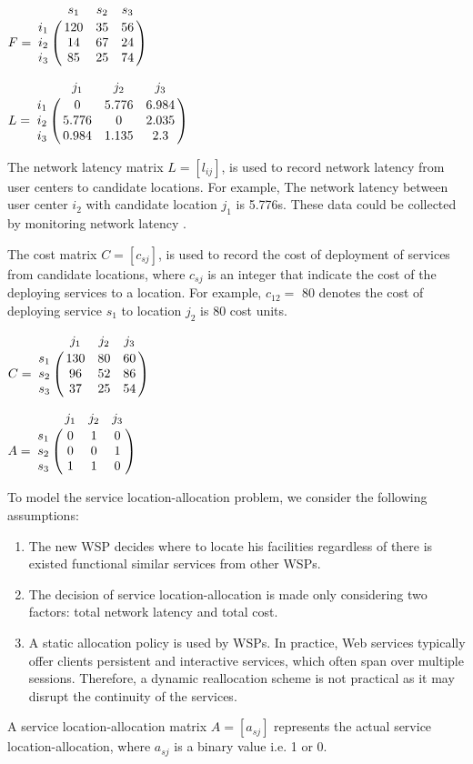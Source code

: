 \documentclass{llncs}
\let\bbordermatrix\bordermatrix
\begin{document}
\parbox{.45\linewidth}{
{\centering
$
F = \bbordermatrix{~ & s_{1} & s_{2} & s_{3}  \cr
					i_{1}	&120 &35 &56	\cr
					i_{2}	&14  &67 &24 \cr
					i_{3}	&85 &25 &74 \cr}
$
\\}
}
\parbox{.45\linewidth}{
{\centering
$
L = \bbordermatrix{~ & j_{1} & j_{2} & j_{3} \cr
					i_{1}	&0 &5.776 &6.984	\cr
					i_{2}	&5.776  &0 &2.035 \cr
					i_{3}	&0.984 &1.135	&2.3 \cr}
$
\\}
}

The network latency matrix $L = [l_{ij}]$, is used to record network latency from user centers to 
candidate locations. For example, The network latency between user center $i_{2}$ with candidate location $j_{1}$ 
is 5.776s. These data could be collected by monitoring network latency \cite{6076756} \cite{5552800}.

The cost matrix $C = [c_{sj}]$, is used to record the cost of deployment of services from candidate locations, 
where $c_{sj}$ is an integer that indicate the cost of the deploying services to a location. 
For example, $c_{12} = $ 80 denotes the cost of deploying service $s_{1}$ to location $j_{2}$ is 80 cost units.

\parbox{.45\linewidth}{
{\centering
$
C = \bbordermatrix{~ & j_{1} & j_{2} & j_{3}\cr
					s_{1}	&130 &80 &60\cr
					s_{2}	&96  &52 &86\cr
					s_{3}	&37 &25 &54\cr}
$
\\}
}
\parbox{.45\linewidth}{
{\centering
$
A = \bbordermatrix{~ & j_{1} & j_{2} & j_{3}\cr
					s_{1}	&0 &1 &0	\cr
					s_{2}	&0  &0 &1	\cr
					s_{3}	&1 &1 &0	\cr}
$
\\}
}

To model the service location-allocation problem, we consider the following assumptions:
\begin{enumerate}
	\item The new WSP decides where to locate his facilities regardless of there is existed functional similar services from other WSPs.
	\item The decision of service location-allocation is made only considering two factors: total network latency and total cost.
	\item A static allocation policy is used by WSPs. In practice, Web services typically offer clients persistent and interactive services, which often span over multiple sessions. Therefore, a dynamic reallocation scheme is not practical as it may disrupt the continuity of the services.
\end{enumerate}


A service location-allocation matrix $A = [a_{sj}]$ represents the actual service location-allocation, where $a_{sj}$  is a binary value i.e. 1 or 0.
\end{document}
